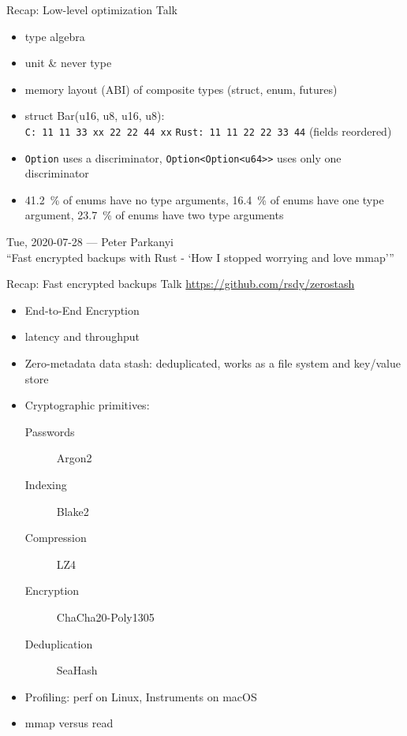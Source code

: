 \documentclass{beamer}
\begin{document}
\begin{frame}[fragile]{Recap: Low-level optimization Talk}
  \begin{itemize}
    \item type algebra
    \item unit \& never type
    \item memory layout (ABI) of composite types (struct, enum, futures)
    \item struct Bar(u16, u8, u16, u8): \\
          \texttt{C:    11 11 33 xx 22 22 44 xx}
          \texttt{Rust: 11 11 22 22 33 44}  (fields reordered)
    \item \texttt{Option} uses a discriminator, \texttt{Option<Option<u64>>} uses only one discriminator
    \item 41.2~\% of enums have no type arguments, 16.4~\% of enums have one type argument, 23.7~\% of enums have two type arguments
  \end{itemize}
\end{frame}

\begin{frame}[standout]
  Tue, 2020-07-28 --- Peter Parkanyi \\
  \enquote{Fast encrypted backups with Rust - \enquote{How I stopped worrying and love mmap}}
\end{frame}

\begin{frame}[fragile]{Recap: Fast encrypted backups Talk}
  \url{https://github.com/rsdy/zerostash}
  \begin{itemize}
    \item End-to-End Encryption
    \item latency and throughput
    \item Zero-metadata data stash: deduplicated, works as a file system and key/value store
    \item Cryptographic primitives:
      \begin{description}
        \item[Passwords] Argon2
        \item[Indexing] Blake2
        \item[Compression] LZ4
        \item[Encryption] ChaCha20-Poly1305
        \item[Deduplication] SeaHash
      \end{description}
    \item Profiling: perf on Linux, Instruments on macOS
    \item mmap versus read
  \end{itemize}
\end{frame}
\end{document}
